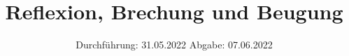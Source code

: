 

\subject{VERSUCH NUMMER 400}
\title{Reflexion, Brechung und Beugung}
\date{%
  Durchführung: 31.05.2022
  \hspace{3em}
  Abgabe: 07.06.2022
}



\maketitle
\thispagestyle{empty}
\tableofcontents
\newpage






\printbibliography{}


